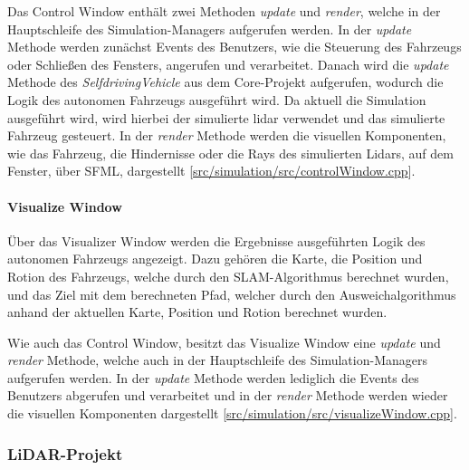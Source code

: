 Das Control Window enthält zwei Methoden \textit{update} und \textit{render}, welche in der Hauptschleife des Simulation-Managers aufgerufen werden. 
In der \textit{update} Methode werden zunächst Events des Benutzers, wie die Steuerung des Fahrzeugs oder Schließen des Fensters, angerufen und verarbeitet. 
Danach wird die \textit{update} Methode des \textit{SelfdrivingVehicle} aus dem Core-Projekt aufgerufen, 
wodurch die Logik des autonomen Fahrzeugs ausgeführt wird. 
Da aktuell die Simulation ausgeführt wird, wird hierbei der simulierte \ac{lidar} verwendet und das simulierte Fahrzeug gesteuert. 
In der \textit{render} Methode werden die visuellen Komponenten, wie das Fahrzeug, die Hindernisse oder die Rays des simulierten Lidars, auf dem Fenster, 
über SFML, dargestellt [\href{https://github.com/Jundy0/Studienarbeit/blob/main/src/simulation/src/controlWindow.cpp}{src/simulation/src/controlWindow.cpp}]. 

\paragraph{Visualize Window} \mbox{}

Über das Visualizer Window werden die Ergebnisse ausgeführten Logik des autonomen Fahrzeugs angezeigt. 
Dazu gehören die Karte, die Position und Rotion des Fahrzeugs, welche durch den SLAM-Algorithmus berechnet wurden, 
und das Ziel mit dem berechneten Pfad, welcher durch den Ausweichalgorithmus anhand der aktuellen Karte, Position und Rotion berechnet wurden. 

Wie auch das Control Window, besitzt das Visualize Window eine \textit{update} und \textit{render} Methode,
 welche auch in der Hauptschleife des Simulation-Managers aufgerufen werden. 
 In der \textit{update} Methode werden lediglich die Events des Benutzers abgerufen und verarbeitet und in der \textit{render} Methode werden 
 wieder die visuellen Komponenten dargestellt 
 [\href{https://github.com/Jundy0/Studienarbeit/blob/main/src/simulation/src/visualizeWindow.cpp}{src/simulation/src/visualizeWindow.cpp}]. 

\subsubsection{LiDAR-Projekt}

